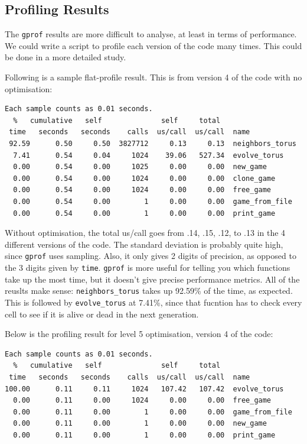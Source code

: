 \documentclass{article}
\begin{document}
\subsection{Profiling Results}
The \verb=gprof= results are more difficult to analyse, at least in terms of performance. We could write a script to profile each version of the code many times. This could be done in a more detailed study. 

Following is a sample flat-profile result. This is from version 4 of the code with no optimisation: 

\begin{verbatim}
Each sample counts as 0.01 seconds.
  %   cumulative   self              self     total    
 time   seconds   seconds    calls  us/call  us/call  name    
 92.59      0.50     0.50  3827712     0.13     0.13  neighbors_torus
  7.41      0.54     0.04     1024    39.06   527.34  evolve_torus
  0.00      0.54     0.00     1025     0.00     0.00  new_game
  0.00      0.54     0.00     1024     0.00     0.00  clone_game
  0.00      0.54     0.00     1024     0.00     0.00  free_game
  0.00      0.54     0.00        1     0.00     0.00  game_from_file
  0.00      0.54     0.00        1     0.00     0.00  print_game
\end{verbatim}

Without optimisation, the total us/call goes from .14, .15, .12, to .13 in the 4 different versions of the code. The standard deviation is probably quite high, since \verb=gprof= uses sampling. Also, it only gives 2 digits of precision, as opposed to the 3 digits given by \verb=time=. \verb=gprof= is more useful for telling you which functions take up the most time, but it doesn't give precise performance metrics. All of the reuslts make sense: \verb=neighbors_torus= takes up 92.59\% of the time, as expected. This is followed by \verb=evolve_torus= at 7.41\%, since that fucntion has to check every cell to see if it is alive or dead in the next generation.  

Below is the profiling result for level 5 optimisation, version 4 of the code: 

\begin{verbatim}
Each sample counts as 0.01 seconds.
  %   cumulative   self              self     total    
 time   seconds   seconds    calls  us/call  us/call  name    
100.00      0.11     0.11     1024   107.42   107.42  evolve_torus
  0.00      0.11     0.00     1024     0.00     0.00  free_game
  0.00      0.11     0.00        1     0.00     0.00  game_from_file
  0.00      0.11     0.00        1     0.00     0.00  new_game
  0.00      0.11     0.00        1     0.00     0.00  print_game
\end{verbatim}
\end{document}
